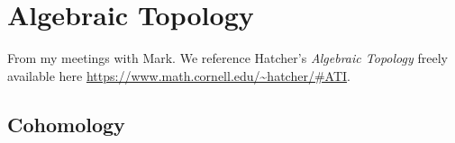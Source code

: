 \chapter{Algebraic Topology}
From my meetings with Mark. We reference Hatcher's \emph{Algebraic
  Topology} \cite{hatcher} freely available here
\url{https://www.math.cornell.edu/~hatcher/#ATI}.

\section{Cohomology}


